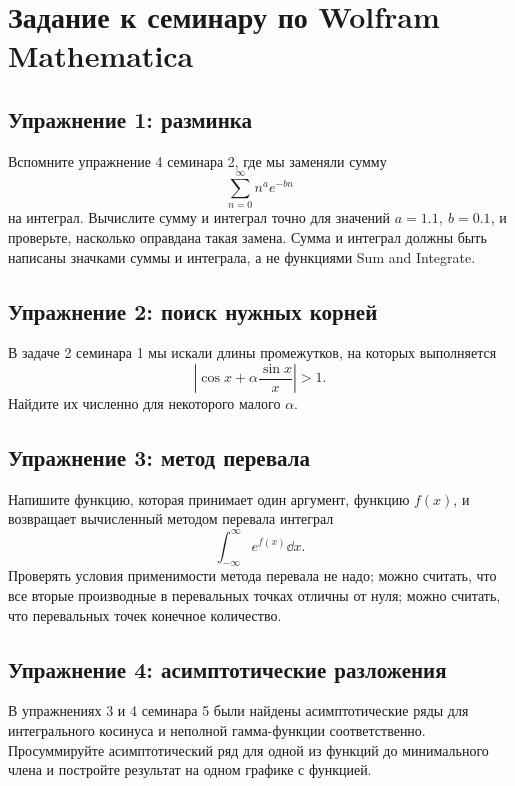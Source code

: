 \documentclass[a4paper,12pt]{article}
\author{}
\title{}
\date{\today}
\theoremstyle{plain} %
\theoremstyle{definition} %
\theoremstyle{remark} %
\begin{document}
\section*{Задание к семинару по Wolfram Mathematica}

\subsection*{Упражнение 1: разминка}
Вспомните упражнение 4 семинара 2, где мы заменяли сумму
\begin{equation}
\sum_{n=0}^{\infty} n^a e^{-bn}
\end{equation}
на интеграл. Вычислите сумму и интеграл точно для значений $a=1.1,\ b=0.1$, и проверьте, насколько оправдана такая замена. Сумма и интеграл должны быть написаны значками суммы и интеграла, а не функциями Sum and Integrate.

\subsection*{Упражнение 2: поиск нужных корней}
В задаче 2 семинара 1 мы искали длины промежутков, на которых выполняется
\begin{equation}
	\left| \cos x + \alpha \frac{\sin x}{x} \right| > 1.
\end{equation}
Найдите их численно для некоторого малого $\alpha$.

\subsection*{Упражнение 3: метод перевала}
Напишите функцию, которая принимает один аргумент, функцию $f(x)$, и возвращает вычисленный методом перевала интеграл
\begin{equation}
	\int_{-\infty}^{\infty} e^{f(x)} \dd x.
\end{equation}
Проверять условия применимости метода перевала не надо; можно считать, что все вторые производные в перевальных точках отличны от нуля; можно считать, что перевальных точек конечное количество.

\subsection*{Упражнение 4: асимптотические разложения}
В упражнениях 3 и 4 семинара 5 были найдены асимптотические ряды для интегрального косинуса и неполной гамма-функции соответственно. Просуммируйте асимптотический ряд для одной из функций до минимального члена и постройте результат на одном графике с функцией. 
\end{document}
